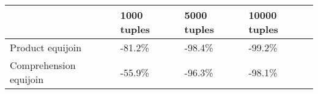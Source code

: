 \begin{tabular}{llll}
\toprule
 & 1000 tuples & 5000 tuples & 10000 tuples \\
\midrule
Product equijoin & -81.2\% & -98.4\% & -99.2\% \\
Comprehension equijoin & -55.9\% & -96.3\% & -98.1\% \\
\bottomrule
\end{tabular}
